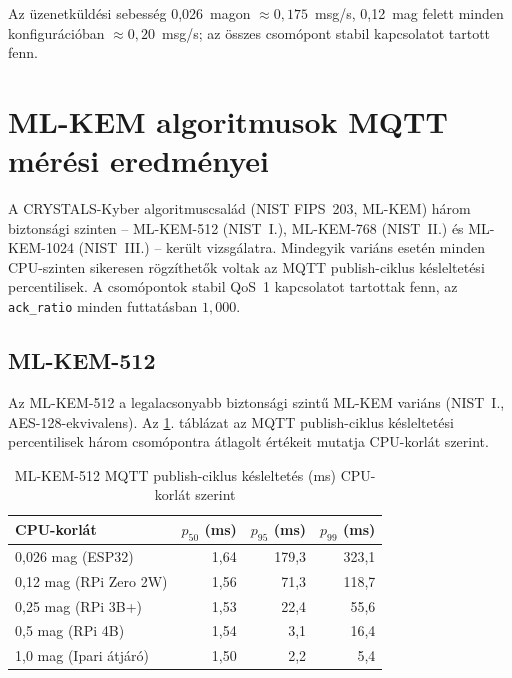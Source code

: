 Az üzenetküldési sebesség 0,026~magon $\approx 0{,}175$~msg/s, 0,12~mag felett minden
konfigurációban $\approx 0{,}20$~msg/s; az összes csomópont stabil kapcsolatot tartott fenn.

\section{ML-KEM algoritmusok MQTT mérési eredményei}

A CRYSTALS-Kyber algoritmuscsalád (NIST FIPS~203, ML-KEM) három biztonsági szinten --
ML-KEM-512 (NIST~I.), ML-KEM-768 (NIST~II.) és ML-KEM-1024 (NIST~III.) --
került vizsgálatra. Mindegyik variáns esetén minden CPU-szinten sikeresen rögzíthetők voltak az MQTT
publish-ciklus késleltetési percentilisek. A csomópontok stabil QoS~1 kapcsolatot tartottak
fenn, az \texttt{ack\_ratio} minden futtatásban $1{,}000$.

\subsection{ML-KEM-512}

Az ML-KEM-512 a legalacsonyabb biztonsági szintű ML-KEM variáns (NIST~I., AES-128-ekvivalens).
Az \ref{tab:mlkem512-latency}. táblázat az MQTT publish-ciklus késleltetési percentilisek
három csomópontra átlagolt értékeit mutatja CPU-korlát szerint.

\begin{table}[ht]
\centering
\caption{ML-KEM-512 MQTT publish-ciklus késleltetés (ms) CPU-korlát szerint}
\label{tab:mlkem512-latency}
\begin{tabular}{lrrr}
\hline
\textbf{CPU-korlát} & \textbf{$p_{50}$ (ms)} & \textbf{$p_{95}$ (ms)} & \textbf{$p_{99}$ (ms)} \\
\hline
0,026 mag (ESP32)       & 1,64 & 179,3 & 323,1 \\
0,12 mag (RPi Zero 2W)  & 1,56 &  71,3 & 118,7 \\
0,25 mag (RPi 3B+)      & 1,53 &  22,4 &  55,6 \\
0,5 mag (RPi 4B)        & 1,54 &   3,1 &  16,4 \\
1,0 mag (Ipari átjáró)  & 1,50 &   2,2 &   5,4 \\
\hline
\end{tabular}
\end{table}

